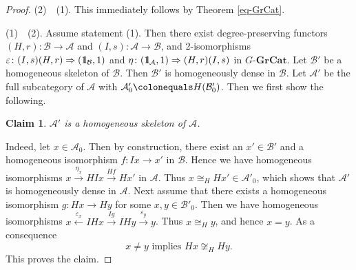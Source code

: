 \documentclass{surv-l}
\numberwithin{equation}{chapter}
\numberwithin{figure}{chapter}
\theoremstyle{plain}
\newtheorem*{clm-nn}{Claim}
\theoremstyle{definition}
\theoremstyle{remark}
\newcommand{\id}{1\kern-.25em{\text{{\rm l}}}}
\newcommand{\GGrCat}{G\text{-}\mathbf{GrCat}}
\begin{document}
\begin{proof}
(2)\ \text{$\Rightarrow$}\  (1).
This immediately follows by Theorem \ref{eq-GrCat}.

(1)\ \text{$\Rightarrow$}\  (2).
Assume statement (1).
Then there exist degree-preserving functors
$(H, r) \colon \mathcal{B} \to \mathcal{A}$ and
$(I, s) \colon \mathcal{A} \to \mathcal{B}$, and 2-isomorphisms
$\varepsilon \colon (I,s)(H, r) \Rightarrow (\id_{\mathcal{B}}, 1)$ and
$\eta \colon (\id_{\mathcal{A}}, 1) \Rightarrow (H, r)(I,s)$ in $\GGrCat$.
Let $\mathcal{B}'$ be a homogeneous skeleton of $\mathcal{B}$.
Then $\mathcal{B}'$ is homogeneously dense in $\mathcal{B}$.
Let $\mathcal{A}'$ be the full subcategory of $\mathcal{A}$ with $\mathcal{A}'_0\colonequals  H(\mathcal{B}'_0)$.
Then we first show the following.

\begin{clm-nn}
$\mathcal{A}'$ is a homogeneous skeleton of $\mathcal{A}$.
\end{clm-nn}

Indeed, let $x \in \mathcal{A}_0$.
Then by construction, there exist an $x' \in \mathcal{B}'$ and
a homogeneous isomorphism $f \colon Ix \to x'$ in $\mathcal{B}$.
Hence we have homogeneous isomorphisms
$x \xrightarrow{\eta_x} HIx \xrightarrow{Hf} Hx'$ in $\mathcal{A}$.
Thus $x \cong_H Hx' \in \mathcal{A}'_0$,
which shows that $\mathcal{A}'$ is
homogeneously dense in $\mathcal{A}$.
Next assume that there exists a homogeneous isomorphism $g \colon Hx \to Hy$
for some $x, y \in \mathcal{B}'_0$.
Then we have homogeneous isomorphisms
$x \xleftarrow{\varepsilon_x} IHx \xrightarrow{Ig} IHy \xrightarrow{\varepsilon_y} y$.
Thus $x \cong_H y$, and hence $x = y$.
As a consequence
\begin{equation}\label{injective}
 x \ne y \text{ implies } Hx \not\cong_H Hy.
\end{equation}
This proves the claim.


\end{proof}
\end{document}
